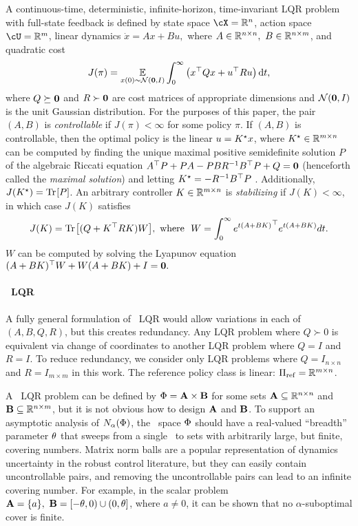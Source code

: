 A continuous-time, deterministic, infinite-horizon, time-invariant LQR problem with full-state feedback is defined by 
state space $\cX = \R^n$,
action space $\cU = \R^m$,
linear dynamics
\(
	\dot x = Ax + Bu,
\)
where $A \in \mathbb{R}^{n \times n},\ B \in \mathbb{R}^{n \times m}$, and quadratic cost 
\[
	J(\pi) = \operatorname*{\mathbb{E}}_{x(0) \sim \operatorname{\mathcal{N}}(\mathbf{0}, I)}
		\int_0^\infty \big(
			x^\top Q x + u^\top R u
		\big)\, \mathrm{d} t,
\]
where $Q \succeq \mathbf{0}$ and $R \succ \mathbf{0}$ are cost matrices of appropriate dimensions
and $\operatorname{\mathcal{N}}(\mathbf{0}, I)$ is the unit Gaussian distribution.
For the purposes of this paper, the pair $(A, B)$ is \emph{controllable}
if $J(\pi) < \infty$ for some policy $\pi$.
If $(A, B)$ is controllable,
then the optimal policy %
is the linear
$u = K^\star_{} x$,
where $K^\star_{} \in \mathbb{R}^{m \times n}$
can be computed
by finding the unique maximal positive semidefinite solution $P$
of the algebraic Riccati equation
\(
	A^\top P + P A - P B R^{-1} B^\top P + Q = \mathbf{0}
\)
(henceforth called the \emph{maximal solution})
and letting $K^\star_{} = -R^{-1} B^\top P$
\citep{kalman-contributions}.
Additionally, $J(K^\star_{}) = \mathrm{Tr} \hspace{-1pt} \left[ P \right]$.
An arbitrary controller $K \in \mathbb{R}^{m \times n}$ is \emph{stabilizing} if
$J(K) < \infty$,
in which case $J(K)$ satisfies
\begin{equation}
\label{eq:cost-suboptimal}
	J(K) = \trace{(Q + K^\top R K) W}\!, \
\text{where} \ \ 
	W = \int_0^\infty {e^{t(A + BK)}}^\top {e^{t(A + BK)}} dt.
\end{equation}
$W$ can be computed by solving the Lyapunov equation
\(
	(A + BK)^\top W + W (A + BK)  + I = \mathbf{0}.
\)


\paragraph{\Multidyn\ LQR}
\label{sec:multilqr}
A fully general formulation of \multienv\ LQR
would allow variations in each of $(A, B, Q, R)$,
but this creates redundancy.
Any LQR problem
where $Q \succ 0$
is equivalent via change of coordinates
to another LQR problem where $Q = I$ and $R = I$.
To reduce redundancy,
we consider only \emph{\multidyn} LQR problems where $Q = I_{n \times n}$ and $R = I_{m \times m}$
in this work.
The reference policy class is linear: $\Pi_{\mathrm{ref}} = \mathbb{R}^{m \times n}$.

A \multidyn\ LQR problem can be defined by
$\Phi = \mathbf{A} \times \mathbf{B}$
for some sets $\mathbf{A} \subseteq \mathbb{R}^{n \times n}$ and ${\mathbf{B} \subseteq \mathbb{R}^{n \times m}}$,
but it is not obvious how to design $\mathbf{A}$ and $\mathbf{B}$.
To support an asymptotic analysis of
$N_{\alpha}(\Phi)$,
the \envword\ space $\Phi$ should have a real-valued ``breadth'' parameter $\theta$
that sweeps from a single \envword\ to sets with arbitrarily large, but finite, covering numbers.
Matrix norm balls are a popular representation of dynamics uncertainty in the robust control literature,
but they can easily contain uncontrollable pairs,
and removing the uncontrollable pairs
can lead to an infinite covering number.
For example, in the scalar problem $\mathbf{A} = \{a\},\ \mathbf{B} = [-\theta, 0) \cup (0, \theta]$, where $a \neq 0$,
it can be shown that
no $\alpha$-suboptimal cover is finite.

